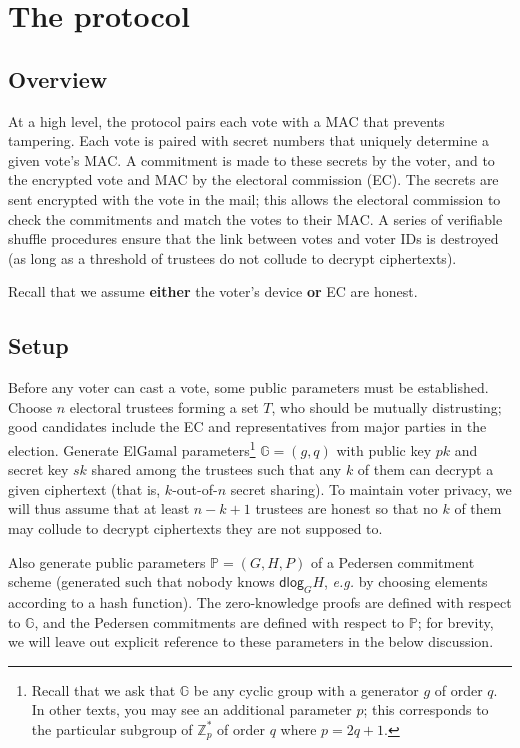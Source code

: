 \documentclass[12pt,a4paper]{article}
\theoremstyle{definition}
\newcommand{\eg}{\textit{e.g. }}
\begin{document}
\section{The protocol}\label{sec-protocol}
\subsection{Overview}
At a high level, the protocol pairs each vote with a MAC that prevents tampering. Each vote is paired with secret numbers that uniquely determine a given vote's MAC. A commitment is made to these secrets by the voter, and to the encrypted vote and MAC by the electoral commission (EC). The secrets are sent encrypted with the vote in the mail; this allows the electoral commission to check the commitments and match the votes to their MAC. A series of verifiable shuffle procedures ensure that the link between votes and voter IDs is destroyed (as long as a threshold of trustees do not collude to decrypt ciphertexts).

Recall that we assume \textbf{either} the voter's device \textbf{or} EC are honest.

\subsection{Setup}
Before any voter can cast a vote, some public parameters must be established. Choose $n$ electoral trustees forming a set $T$, who should be mutually distrusting; good candidates include the EC and representatives from major parties in the election. Generate ElGamal parameters\footnote{Recall that we ask that $\mathbb{G}$ be any cyclic group with a generator $g$ of order $q$. In other texts, you may see an additional parameter $p$; this corresponds to the particular subgroup of $\mathbb{Z}^*_{p}$ of order $q$ where $p = 2q + 1$.} $\mathbb{G}=(g, q)$ with public key $pk$ and secret key $sk$ shared among the trustees such that any $k$ of them can decrypt a given ciphertext (that is, $k$-out-of-$n$ secret sharing). To maintain voter privacy, we will thus assume that at least $n - k + 1$ trustees are honest so that no $k$ of them may collude to decrypt ciphertexts they are not supposed to.

Also generate public parameters $\mathbb{P}=(G, H, P)$ of a Pedersen commitment scheme (generated such that nobody knows $\mathsf{dlog}_G{H}$, \eg by choosing elements according to a hash function). The zero-knowledge proofs are defined with respect to $\mathbb{G}$, and the Pedersen commitments are defined with respect to $\mathbb{P}$; for brevity, we will leave out explicit reference to these parameters in the below discussion.
\end{document}
